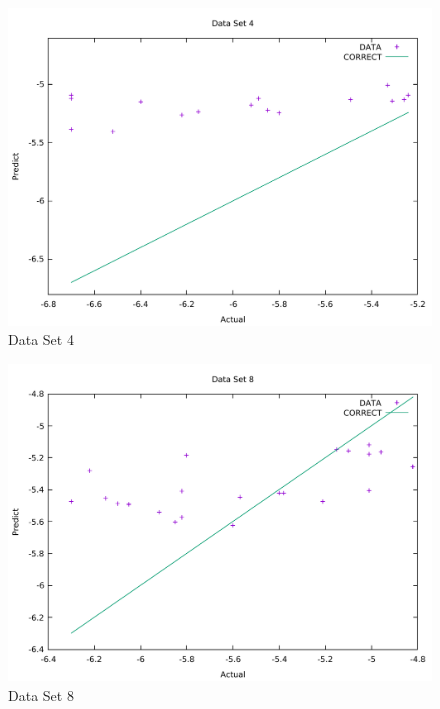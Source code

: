 \documentclass[uplatex,a4j]{jsarticle}
\begin{document}
  \begin{figure}[H]
    \begin{center}
      \includegraphics[width=13cm]{pre4.pdf}
      \caption{Data Set 4}
      \label{4}
    \end{center}
  \end{figure}
  \begin{figure}[H]
    \begin{center}
      \includegraphics[width=13cm]{pre8.pdf}
      \caption{Data Set 8}
      \label{8}
    \end{center}
  \end{figure}
  
\end{document}
